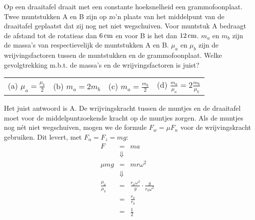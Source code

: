 \begin{exercise} Op een draaitafel draait met een constante hoeksnelheid een grammofoonplaat. Twee muntstukken A en B zijn op zo'n plaats van het middelpunt van de draaitafel geplaatst dat zij nog net niet wegschuiven. Voor muntstuk A bedraagt de afstand tot de rotatieas dan $6\rm\,cm$ en voor B is het dan $12\rm\,cm$. $m_a$ en $m_b$ zijn de massa's van respectievelijk de muntstukken A en B. $\mu_a$ en $\mu_b$ zijn de wrijvingsfactoren tussen de muntstukken en de grammofoonplaat.
\newline
Welke gevolgtrekking m.b.t. de massa's en de wrijvingsfactoren is juist?
\newline
\newline
\begin{tabularx}{\textwidth}{*4{X}}
(a) $\displaystyle\mu_a=\frac{\mu_b}{2}$ & (b) $\displaystyle m_a=2m_b$ & (c) $\displaystyle m_a=\frac{m_b}{2}$ & (d)	$\displaystyle\frac{m_a}{\mu_a}=2\frac{m_b}{\mu_b}$
\end{tabularx}
\begin{oplossing}
Het juist antwoord is A. De wrijvingskracht tussen de muntjes en de
draaitafel moet voor de middelpuntzoekende kracht op de muntjes
zorgen. Als de muntjes nog n\'et niet wegschuiven, mogen we de
formule $F_w=\mu F_n$ voor de wrij\-vings\-kracht gebruiken. Dit
levert, met $F_n=F_z=mg$:
\begin{eqnarray*}
F&=&ma\\
&\Downarrow&\\
\mu mg&=&mr\omega^2\\
&\Downarrow&\\
\frac{\mu_a}{\mu_b}&=&\frac{r_a\omega^2}{g}\cdot\frac{g}{r_b\omega^2}\\
&=&\frac{r_a}{r_b}\\
&=&\frac{1}{2}
\end{eqnarray*}
\end{oplossing}

\end{exercise}

